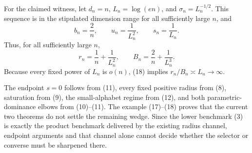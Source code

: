 For the claimed witness, let \(d_n=n\), \(L_n=\log(en)\), and \(\sigma_n=L_n^{-1/2}\).  This sequence is in the stipulated dimension range for all sufficiently large \(n\), and
\[
 b_n=\frac2n,\qquad u_n=\frac1{L_n^2},\qquad s_n=\frac1{L_n}.
\tag{17}
\]
Thus, for all sufficiently large \(n\),
\[
 r_n=\frac1n+\frac1{L_n^2},
 \qquad
 B_n=\frac2n+\frac1{L_n^3}.
\tag{18}
\]
Because every fixed power of \(L_n\) is \(o(n)\), (18) implies \(r_n/B_n\asymp L_n\to\infty\).

The endpoint \(s=0\) follows from (11), every fixed positive radius from (8), saturation from (9), the small-alphabet regime from (12), and both parametric-dominance elbows from (10)--(11).  The example (17)--(18) proves that the current two theorems do not settle the remaining wedge.  Since the lower benchmark (3) is exactly the product benchmark delivered by the existing radius channel, endpoint arguments and that channel alone cannot decide whether the selector or converse must be sharpened there.